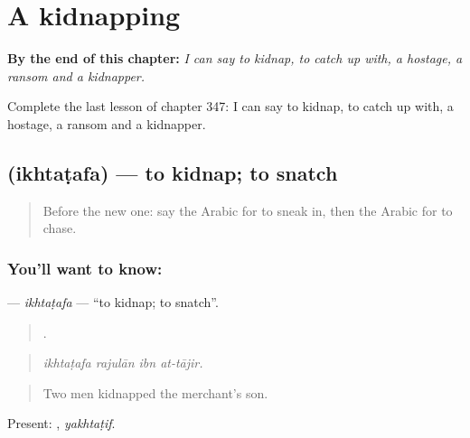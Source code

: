 
\chapter{A kidnapping}
\label{ch:ar-a-kidnapping}

\begin{chapteropening}
\textbf{By the end of this chapter:} \emph{I can say to kidnap, to catch up with, a hostage, a ransom and a kidnapper.}

Complete the last lesson of chapter 347: I can say to kidnap, to catch up with, a hostage, a ransom and a kidnapper.
\end{chapteropening}

\section[\texorpdfstring{\ar{اختطف} (ikhtaṭafa)}{اختطف (ikhtaṭafa)}]{ (ikhtaṭafa) — to kidnap; to snatch}

\label{lesson:AR-C347-ikhtatafa}



\begin{quote}
Before the new one: say the Arabic for to sneak in, then the Arabic for to chase.
\end{quote}

\subsection*{You'll want to know: }
\textbf{} — \emph{ikhtaṭafa} — \textquotedblleft{}to kidnap; to snatch\textquotedblright{}.

\begin{quote}
   .
\end{quote}

\begin{quote}
\emph{ikhtaṭafa rajulān ibn at-tājir.}
\end{quote}

\begin{quote}
Two men kidnapped the merchant’s son.
\end{quote}

Present: , \emph{yakhtaṭif}.

